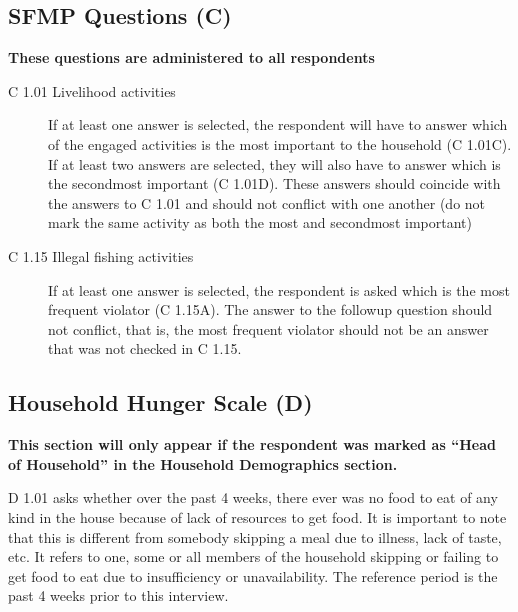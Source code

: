 \documentclass[a4paper]{refart}
\begin{document}
\subsection{SFMP Questions (C)}
\textbf{These questions are administered to all respondents}
\begin{description}







\item[C 1.01 Livelihood activities] If at least one answer is selected, the respondent will have to answer which of the engaged activities is the most important to the household (C 1.01C). If at least two answers are selected, they will also have to answer which is the secondmost important (C 1.01D). These answers should coincide with the answers to C 1.01 and should not conflict with one another (do not mark the same activity as both the most and secondmost important)



\item[C 1.15 Illegal fishing activities] If at least one answer is selected, the respondent is asked which is the most frequent violator (C 1.15A). The answer to the followup question should not conflict, that is, the most frequent violator should not be an answer that was not checked in C 1.15.

\end{description}

\subsection{Household Hunger Scale (D)}
\textbf{This section will only appear if the respondent was marked as ``Head of Household'' in the Household Demographics section.}

D 1.01 asks whether over the past 4 weeks, there ever was no food to eat of any kind in the house because of lack of resources to get food. It is important to note that this is different from somebody skipping a meal due to illness, lack of taste, etc. It refers to one, some or all members of the household skipping or failing to get food to eat due to insufficiency or unavailability. The reference period is the past 4 weeks prior to this interview.
\end{document}
